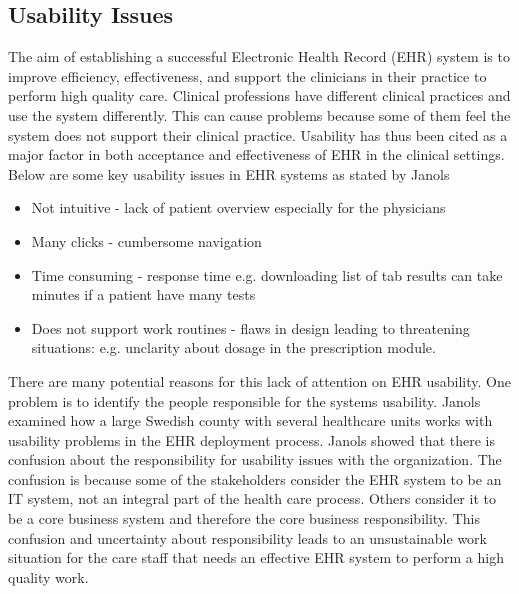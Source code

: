 \documentclass[14pt]{article}
\begin{document}
\subsection{Usability Issues}
\label{sec:futureUsability}
The aim of establishing a successful Electronic Health Record (EHR) system is to improve efficiency, effectiveness, and support the clinicians in their practice to perform high quality care. Clinical professions have different clinical practices and use the system differently. This can cause problems because some of them feel the system does not support their clinical practice. Usability has thus been cited as a major factor in both acceptance and effectiveness of EHR in the clinical settings. Below are some key usability issues in EHR systems as stated by Janols\cite{Janols}  
\begin{itemize}
\item Not intuitive - lack of patient overview especially for the physicians
\item Many clicks - cumbersome navigation
\item Time consuming - response time e.g. downloading list of tab results can take minutes if a patient have many tests
\item Does not support work routines - flaws in design leading to threatening situations:  e.g. unclarity about dosage in the  prescription module.
\end{itemize}

There are many potential reasons for this lack of attention on EHR usability. One problem is to identify the people responsible for the systems usability. Janols \cite{Janols} examined how a large Swedish county with several healthcare units works with usability problems in the EHR deployment process. Janols \cite{Janols} showed that there is confusion about the responsibility for usability issues with the organization. The confusion is because some of the stakeholders consider the EHR system to be an IT system, not an integral part of the health care process. Others consider it to be a core business system and therefore the core business responsibility. This confusion and uncertainty about responsibility leads to an unsustainable work situation for the care staff that needs an effective EHR system to perform a high quality work.
\end{document}
